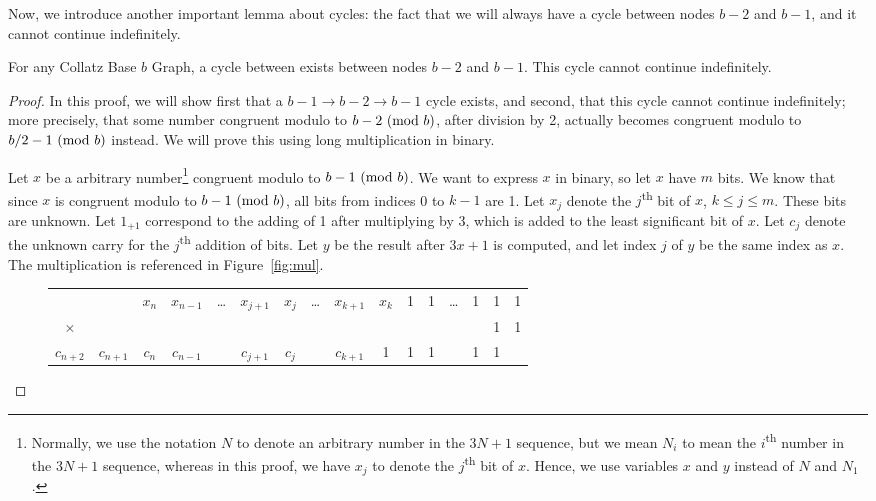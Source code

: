Now, we introduce another important lemma about cycles: the fact that we will always have a cycle between nodes $b-2$ and $b-1$, and it cannot continue indefinitely.
\begin{lemma}
\label{lem:oneConsumption}
 For any Collatz Base $b$ Graph, a cycle between exists between nodes $b-2$ and $b-1$. This cycle cannot continue indefinitely.
\end{lemma}
\begin{proof}
In this proof, we will show first that a $b-1 \rightarrow b-2 \rightarrow b-1$ cycle exists, and second, that this cycle cannot continue indefinitely; more precisely, that some number congruent modulo to $b-2 \ (\mathrm{mod}\ b)$, after division by 2, actually becomes congruent modulo to $b/2-1 \ (\mathrm{mod}\ b)$ instead. We will prove this using long multiplication in binary. \par
Let $x$ be a arbitrary number\footnote{Normally, we use the notation $N$ to denote an arbitrary number in the $3N+1$ sequence, but we mean $N_i$ to mean the $i$\textsuperscript{th} number in the $3N+1$ sequence, whereas in this proof, we have $x_j$ to denote the $j$\textsuperscript{th} bit of $x$. Hence, we use variables $x$ and $y$ instead of $N$ and $N_1$.} congruent modulo to $b-1 \ (\mathrm{mod}\ b)$. We want to express $x$ in binary, so let $x$ have $m$ bits. We know that since $x$ is congruent modulo to $b-1 \ (\mathrm{mod}\ b)$, all bits from indices 0 to $k-1$ are 1. Let $x_j$ denote the $j$\textsuperscript{th} bit of $x$, $k \leq j \leq m$. These bits are unknown. Let $1_{+1}$ correspond to the adding of 1 after multiplying by 3, which is added to the least significant bit of $x$. Let $c_j$ denote the unknown carry for the $j$\textsuperscript{th} addition of bits. Let $y$ be the result after $3x+1$ is computed, and let index $j$ of $y$ be the same index as $x$. The multiplication is referenced in Figure~\ref{fig:mul}. \par
\begin{figure}
\begin{tabular}{*{16}c}%
 & & $ x_{n}$  & $ x_{n-1}$  & \ldots & $ x_{j+1}$  & $ x_{j}$  & \ldots & $ x_{k+1}$  & $ x_{k}$  & 1 & 1 & \ldots & 1 & 1 & 1 \\
$\times$ & & & & & & & & & & & & & & 1 & 1 \\
\hline
\tiny ${\scriptscriptstyle c_{n+2}}$ & ${\scriptscriptstyle c_{n+1}}$ & ${\scriptscriptstyle c_{n}}$ & ${\scriptscriptstyle c_{n-1}}$ & & ${\scriptscriptstyle c_{j+1}}$ & ${\scriptscriptstyle c_{j}}$ & & ${\scriptscriptstyle c_{k+1}}$ & \tiny 1 & \tiny 1 &  \tiny 1 & &  \tiny 1 & \tiny 1 & \\

\end{tabular}
\end{figure}
\end{proof}
